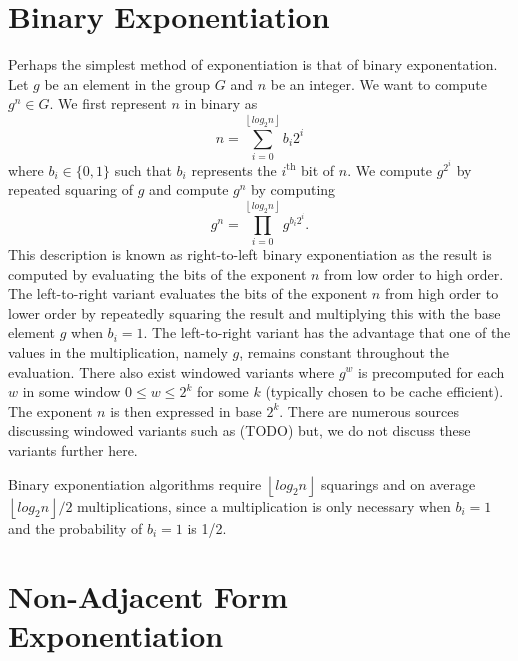 \documentclass{ucalgthes1}
\theoremstyle{plain}
\theoremstyle{definition}
\newcommand{\floor}[1]{\left\lfloor #1 \right\rfloor}
\begin{document}
\section{Binary Exponentiation}\label{section:binary}
Perhaps the simplest method of exponentiation is that of binary exponentation.  Let $g$ be an element in the group $G$ and $n$ be an integer.  We want to compute $g^n \in G$.  We first represent $n$ in binary as
\[
	n = \sum_{i=0}^{\floor{log_2 n}} b_i 2^i
\]
where $b_i \in \{0, 1\}$ such that $b_i$ represents the $i^{\textrm{th}}$ bit of $n$.   We compute $g^{2^i}$ by repeated squaring of $g$ and compute $g^n$ by computing
\[
	g^n = \prod_{i=0}^{\floor{log_2 n}} g^{b_i 2^i}.
\]
This description is known as right-to-left binary exponentiation as the result is computed by evaluating the bits of the exponent $n$ from low order to high order.  The left-to-right variant evaluates the bits of the exponent $n$ from high order to lower order by repeatedly squaring the result and multiplying this with the base element $g$ when $b_i = 1$.  The left-to-right variant has the advantage that one of the values in the multiplication, namely $g$, remains constant throughout the evaluation.  There also exist windowed variants where $g^w$ is precomputed for each $w$ in some window $0 \le w \le 2^k$ for some $k$ (typically chosen to be cache efficient). The exponent $n$ is then expressed in base $2^k$.  There are numerous sources discussing windowed variants such as (TODO) but, we do not discuss these variants further here.

Binary exponentiation algorithms require $\floor{log_2 n}$ squarings and on average $\floor{log_2 n}/2$ multiplications, since a multiplication is only necessary when $b_i = 1$ and the probability of $b_i = 1$ is 1/2.

\bigbreak
\section{Non-Adjacent Form Exponentiation}\label{section:naf}
\end{document}
